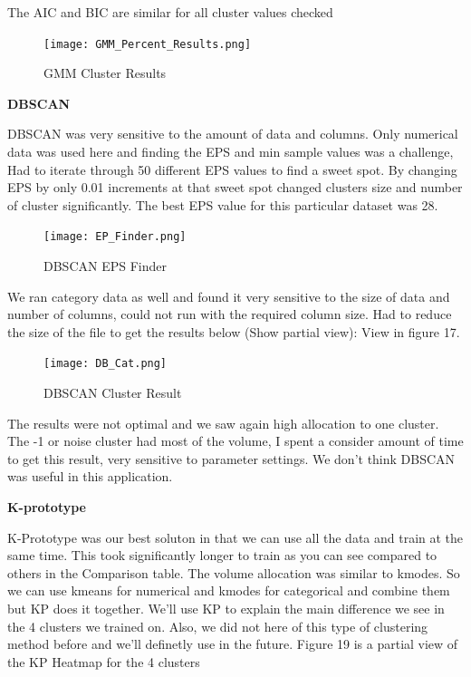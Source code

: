 \documentclass[conference]{IEEEtran}
\begin{document}
\begin{center}
The AIC and BIC are similar for all cluster values checked

\begin{figure}[!h]
	\texttt{[image: GMM\_Percent\_Results.png]}
	\caption{GMM Cluster Results}
	\label{fig: GMM Cluster Results (Partial View)}
 \end{figure}
\begin{center} 

\textbf{DBSCAN} 
\end{center}
DBSCAN was very sensitive to the amount of data and columns.  Only numerical data was used here and finding the EPS and min sample values was a challenge,  Had to iterate through 50 different EPS values to find a sweet spot.  By changing EPS by only 0.01 increments at that sweet spot changed clusters size and number of cluster significantly. The best EPS value for this particular dataset was 28.

\begin{figure}[!h]
	\texttt{[image: EP\_Finder.png]}
	\caption{DBSCAN EPS Finder}
	\label{fig: EPS Finder}
 \end{figure}
We ran category data as well and found it very sensitive to the size of data and number of columns, could not run with the required column size.  Had to reduce the size of the file to get the results below (Show partial view): View in figure 17.

\begin{figure}[!h]
	\texttt{[image: DB\_Cat.png]}
	\caption{DBSCAN Cluster Result}
	\label{fig: DBSCAN Cluster Result}
 \end{figure}
The results were not optimal and we saw again high allocation to one cluster. The -1 or noise cluster had most of the volume,  I spent a consider amount of time to get this result, very sensitive to parameter settings.  We don't think DBSCAN was useful in this application.

\begin{center} 
\textbf{K-prototype} 
\end{center}

K-Prototype was our best soluton in that we can use all the data and train at the same time.  This took significantly longer to train as you can see compared to others in the Comparison table.  The volume allocation was similar to kmodes.  So we can use kmeans for numerical and kmodes for categorical and combine them but KP does it together.  We'll use KP to explain the main difference we see in the 4 clusters we trained on. Also, we did not here of this type of clustering method before and we'll definetly use in the future.
Figure 19 is a partial view of the KP Heatmap for the 4 clusters




\end{center}
\end{document}
